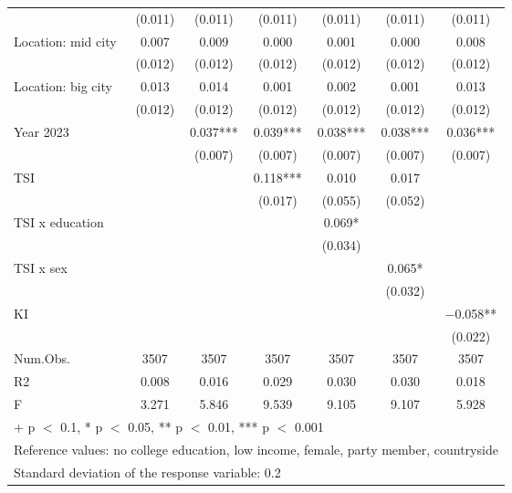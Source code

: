 \documentclass[
  number]{elsarticle}
\begin{document}
\begin{table}
{\begin{tabular}[t]{lcccccc}
 & (\num{0.011}) & (\num{0.011}) & (\num{0.011}) & (\num{0.011}) & (\num{0.011}) & (\num{0.011})\\
Location: mid city & \num{0.007} & \num{0.009} & \num{0.000} & \num{0.001} & \num{0.000} & \num{0.008}\\
 & (\num{0.012}) & (\num{0.012}) & (\num{0.012}) & (\num{0.012}) & (\num{0.012}) & \vphantom{1} (\num{0.012})\\
Location: big city & \num{0.013} & \num{0.014} & \num{0.001} & \num{0.002} & \num{0.001} & \num{0.013}\\
 & (\num{0.012}) & (\num{0.012}) & (\num{0.012}) & (\num{0.012}) & (\num{0.012}) & (\num{0.012})\\
Year 2023 &  & \num{0.037}*** & \num{0.039}*** & \num{0.038}*** & \num{0.038}*** & \num{0.036}***\\
 &  & (\num{0.007}) & (\num{0.007}) & (\num{0.007}) & (\num{0.007}) & (\num{0.007})\\
TSI &  &  & \num{0.118}*** & \num{0.010} & \num{0.017} & \\
 &  &  & (\num{0.017}) & (\num{0.055}) & (\num{0.052}) & \\
TSI x education &  &  &  & \num{0.069}* &  & \\
 &  &  &  & (\num{0.034}) &  & \\
TSI x sex &  &  &  &  & \num{0.065}* & \\
 &  &  &  &  & (\num{0.032}) & \\
KI &  &  &  &  &  & \num{-0.058}**\\
 &  &  &  &  &  & (\num{0.022})\\
\midrule
Num.Obs. & \num{3507} & \num{3507} & \num{3507} & \num{3507} & \num{3507} & \num{3507}\\
R2 & \num{0.008} & \num{0.016} & \num{0.029} & \num{0.030} & \num{0.030} & \num{0.018}\\
F & \num{3.271} & \num{5.846} & \num{9.539} & \num{9.105} & \num{9.107} & \num{5.928}\\
\bottomrule
\multicolumn{7}{l}{\rule{0pt}{1em}+ p $<$ 0.1, * p $<$ 0.05, ** p $<$ 0.01, *** p $<$ 0.001}\\
\multicolumn{7}{l}{\rule{0pt}{1em}Reference values: no college education, low income, female, party member, countryside}\\
\multicolumn{7}{l}{\rule{0pt}{1em}Standard deviation of the response variable:  0.2}\\
\end{tabular}

}

\end{table}%
\end{document}
